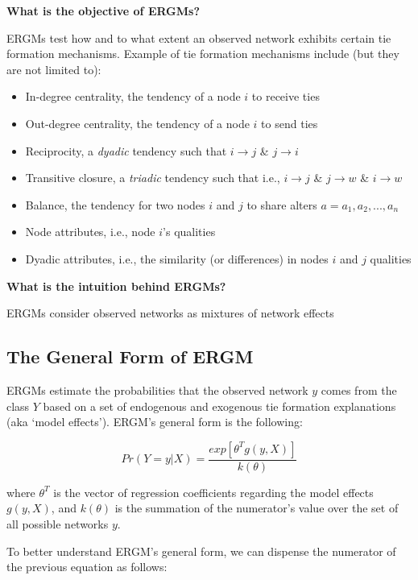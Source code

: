 \documentclass[
  letterpaper,
  DIV=11,
  numbers=noendperiod]{scrartcl}
\providecommand{\tightlist}{%
  \setlength{\itemsep}{0pt}\setlength{\parskip}{0pt}}\usepackage{longtable,booktabs,array}
\begin{document}
\textbf{What is the objective of ERGMs?}

ERGMs test how and to what extent an observed network exhibits certain
tie formation mechanisms. Example of tie formation mechanisms include
(but they are not limited to):

\begin{itemize}
\tightlist
\item
  In-degree centrality, the tendency of a node \(i\) to receive ties
\item
  Out-degree centrality, the tendency of a node \(i\) to send ties
\item
  Reciprocity, a \emph{dyadic} tendency such that \(i \rightarrow j\) \&
  \(j \rightarrow i\)
\item
  Transitive closure, a \emph{triadic} tendency such that i.e.,
  \(i \rightarrow j\) \& \(j \rightarrow w\) \& \(i \rightarrow w\)
\item
  Balance, the tendency for two nodes \(i\) and \(j\) to share alters
  \(a = {a_{1}, a_{2}, ..., a_{n}}\)
\item
  Node attributes, i.e., node \(i\)'s qualities
\item
  Dyadic attributes, i.e., the similarity (or differences) in nodes
  \(i\) and \(j\) qualities
\end{itemize}

\textbf{What is the intuition behind ERGMs?}

ERGMs consider observed networks as mixtures of network effects

\subsection{The General Form of ERGM}\label{the-general-form-of-ergm}

ERGMs estimate the probabilities that the observed network \(y\) comes
from the class \(Y\) based on a set of endogenous and exogenous tie
formation explanations (aka `model effects'). ERGM's general form is the
following:

\begin{equation}\label{eq:ergm_gen_form}
Pr(Y = y|X) = \frac{exp[\theta^{T}g(y,X)]}{k(\theta)}
\end{equation}

where \(\theta^{T}\) is the vector of regression coefficients regarding
the model effects \(g(y, X)\), and \(k(\theta)\) is the summation of the
numerator's value over the set of all possible networks \(y\).

To better understand ERGM's general form, we can dispense the numerator
of the previous equation as follows:
\end{document}
